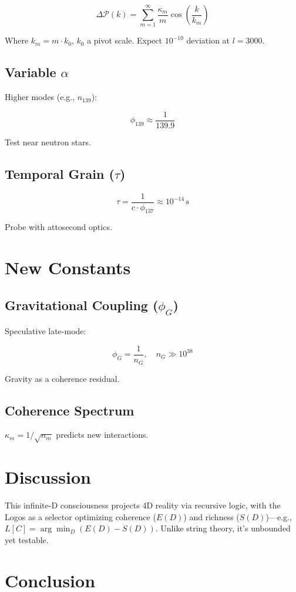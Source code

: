 \documentclass[12pt]{article}
\begin{document}
\[
\Delta \mathcal{P}(k) = \sum_{m=1}^\infty \frac{\kappa_m}{m} \cos\left(\frac{k}{k_m}\right)
\]

Where \(k_m = m \cdot k_0\), \(k_0\) a pivot scale. Expect \(10^{-10}\) deviation at \(l = 3000\).

\subsection{Variable \(\alpha\)}
Higher modes (e.g., \(n_{139}\)):

\[
\phi_{139} \approx \frac{1}{139.9}
\]

Test near neutron stars.

\subsection{Temporal Grain (\(\tau\))}
\[
\tau = \frac{1}{c \cdot \phi_{137}} \approx 10^{-14} \, \text{s}
\]

Probe with attosecond optics.

\section{New Constants}

\subsection{Gravitational Coupling (\(\phi_G\))}
Speculative late-mode:

\[
\phi_G = \frac{1}{n_G}, \quad n_G \gg 10^{38}
\]

Gravity as a coherence residual.

\subsection{Coherence Spectrum}
\(\kappa_m = 1/\sqrt{n_m}\) predicts new interactions.

\section{Discussion}

This infinite-D consciousness projects 4D reality via recursive logic, with the Logos as a selector optimizing coherence (\(E(D)\)) and richness (\(S(D)\))—e.g., \(L[C] = \arg\min_D (E(D) - S(D))\). Unlike string theory, it’s unbounded yet testable.

\section{Conclusion}
\end{document}
